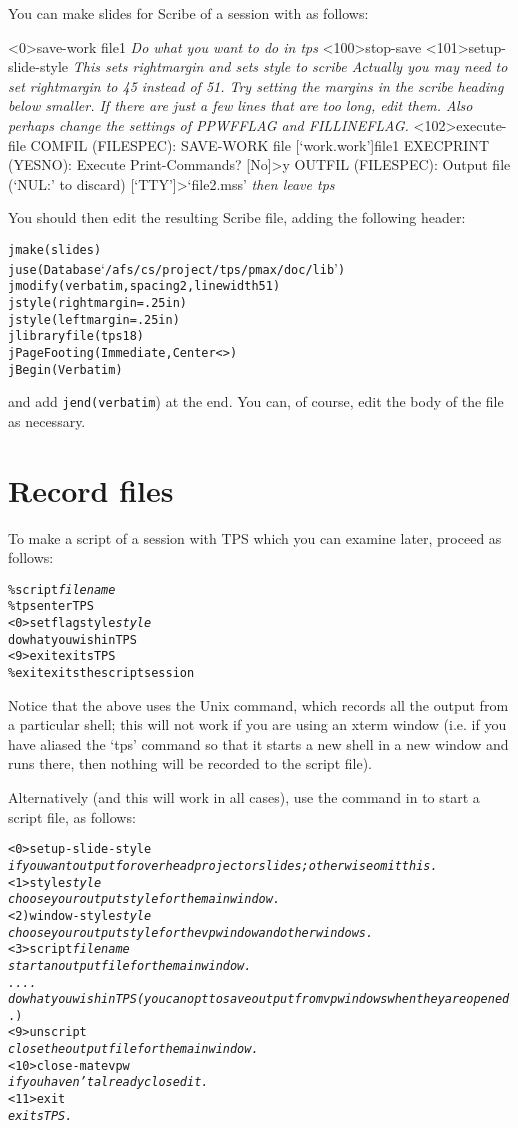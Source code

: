 You can make slides for Scribe of a session with {\TPS} as follows:

\begin{tpsexample}
<0>save-work file1
{\it Do what you want to do in tps}
<100>stop-save
<101>setup-slide-style		
{\it This sets rightmargin and sets style to scribe
Actually you may need to set rightmargin to 45 instead of 51.
Try setting the margins in the scribe heading below smaller.
If there are just a few lines that are too long, edit them.
Also perhaps change the settings of PPWFFLAG and FILLINEFLAG.}
<102>execute-file
COMFIL (FILESPEC): SAVE-WORK file [`work.work']file1
EXECPRINT (YESNO): Execute Print-Commands? [No]>y
OUTFIL (FILESPEC): Output file (`NUL:' to discard) [`TTY']>`file2.mss'
{\it then leave tps}
\end{tpsexample}

You should then edit the resulting Scribe file, adding the following
header:

\begin{alltt}
jmake(slides)
juse(Database `/afs/cs/project/tps/pmax/doc/lib')
jmodify(verbatim, spacing 2, linewidth 51)
jstyle(rightmargin = .25in)
jstyle(leftmargin = .25in)
jlibraryfile(tps18)
jPageFooting(Immediate,  Center  <\value{Page}>)
jBegin(Verbatim)
\end{alltt}

and add {\tt jend(verbatim}) at the end. You can, of course, edit the body
of the file as necessary.

\section{Record files}
To make a script of a session with TPS which you can examine
later, proceed as follows:
\begin{alltt}
\%script {\it filename}		
\%tps				enter TPS
<0>setflag style {\it style}
				do what you wish in TPS
<9>exit				exits TPS
\%exit				exits the script session
\end{alltt}

Notice that the above uses the Unix  command, which records all the
output from a particular shell; this will not work if you are using an xterm window
(i.e. if you have aliased the `tps' command so that it starts a new shell in a new window
and runs {\TPS} there, then nothing will be recorded to the script file).

Alternatively (and this will work in all cases), use the command 
in {\TPS} to start a script file, as follows:
\begin{alltt}
<0>setup-slide-style
{\it if you want output for overhead projector slides; otherwise omit this.}
<1>style {\it style}
{\it choose your output style for the main window.}
<2)window-style {\it style}
{\it choose your output style for the vpwindow and other windows.}
<3>script {\it filename}
{\it start an output file for the main window.}
{\it ....
do what you wish in TPS (you can opt to save output from vpwindows when they are opened}.)
<9>unscript
{\it close the output file for the main window.}
<10>close-matevpw
{\it if you haven't already closed it.}
<11>exit
{\it exits TPS.}
\end{alltt}

